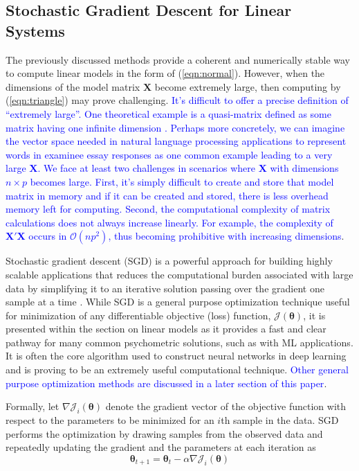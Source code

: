 \documentclass[12pt]{article}
\begin{document}
\subsection*{Stochastic Gradient Descent for Linear Systems}

The previously discussed methods provide a coherent and numerically stable way to compute linear models in the form of (\ref{eqn:normal}). However, when the dimensions of the model matrix $\bm{X}$ become extremely large, then computing by (\ref{eqn:triangle}) may prove challenging. \textcolor{blue}{It's difficult to offer a precise definition of ``extremely large''. One theoretical example is a quasi-matrix defined as some matrix having one infinite dimension \cite{quasi-matrix}. Perhaps more concretely, we can imagine the vector space needed in natural language processing applications to represent words in examinee essay responses as one common example leading to a very large $\bm{X}$. We face at least two challenges in scenarios where $\bm{X}$ with dimensions $n \times p$ becomes large. First, it's simply difficult to create and store that model matrix in memory and if it can be created and stored, there is less overhead memory left for computing. Second, the computational complexity of matrix calculations does not always increase linearly. For example, the complexity of $\bm{X'X}$ occurs in $\mathcal{O}(np^2)$, thus becoming prohibitive with increasing dimensions}.

Stochastic gradient descent (SGD) is a powerful approach for building highly scalable applications \cite{Toulis2015ScalableES} that reduces the computational burden associated with large data by simplifying it to an iterative solution passing over the gradient one sample at a time \cite{cizek,shamir,tran}. While SGD is a general purpose optimization technique useful for minimization of any differentiable objective (loss) function, $\mathcal{J}(\bm{\theta})$, it is presented within the section on linear models as it provides a fast and clear pathway for many common psychometric solutions, such as with ML applications. It is often the core algorithm used to construct neural networks in deep learning and is proving to be an extremely useful computational technique. \textcolor{blue}{Other general purpose optimization methods are discussed in a later section of this paper}. 

Formally, let $\nabla\mathcal{J}_i(\bm{\theta})$ denote the gradient vector of the objective function with respect to the parameters to be minimized for an $i$th sample in the data. SGD performs the optimization by drawing samples from the observed data and repeatedly updating the gradient and the parameters at each iteration as
\begin{equation}
\label{eqn:sgd}
\bm{\theta}_{t+1} = \bm{\theta}_t - \alpha \nabla\mathcal{J}_i(\bm{\theta})
\end{equation}
\end{document}
